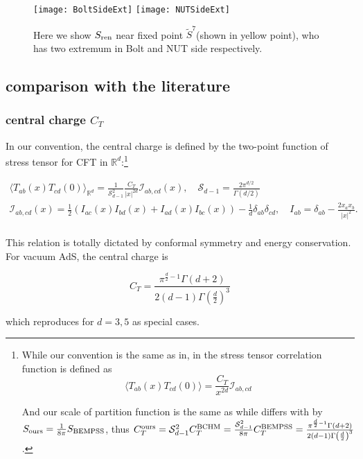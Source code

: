 \documentclass[12pt, a4paper]{article}
\numberwithin{equation}{section}
\newcommand{\be}{\begin{equation}}
\newcommand{\ee}{\end{equation}}
\newcommand{\cS}{\mathcal{S}}
\newcommand{\cI}{\mathcal{I}}
\begin{document}
\begin{figure}[t]
	\centering
	\texttt{[image: BoltSideExt]}
	\hfil
	\texttt{[image: NUTSideExt]}
	\caption{{\rm Here we show $S_{\rm ren}$ near fixed point $\tilde{S}^7$(shown in yellow point), who has two extremum in Bolt and NUT side respectively.}}
	\label{BoltSideExt}
\end{figure}

\subsection{comparison with the literature}
	\subsubsection{central charge $C_T$}
In our convention, the central charge is defined by the two-point function of stress tensor for CFT in $\mathbb{R}^d$:\footnote{While our convention is the same as in\cite{Bobev:2017pf}, in \cite{Bueno:2018pf}\cite{Buchel:2010ad} the stress tensor correlation function is defined as
	\be
	\langle T_{ab}(x)T_{cd}(0) \rangle = \frac{C_T}{x^{2d}}\cI_{ab,cd}
	\ee
	
	And our scale of partition function is the same as \cite{Bueno:2018pf} while differs with \cite{Buchel:2010ad} by $S_{\rm ours} = \frac{1}{8\pi} S_{\rm BEMPSS}$, thus $C_T^{\rm ours} = \cS_{d-1}^2 C_T^{\rm BCHM} = \frac{ \cS_{d-1}^2}{8\pi}C_T^{\rm BEMPSS} =\frac{\pi ^{\frac{d}{2}-1} \Gamma (d+2)}{2 (d-1) \Gamma \left(\frac{d}{2}\right)^3} $.
}

\be
\begin{aligned}
	\langle T_{ab}(x)T_{cd}(0)\rangle_{\mathbb{R}^d} = \frac{1}{\cS_{d-1}^2}\frac{C_T}{|x|^{2d}}\cI_{ab,cd}(x),\quad \cS_{d-1} = \frac{2\pi^{d/2}}{\Gamma(d/2)}\\
	\cI_{ab,cd}(x) = \frac{1}{2}(I_{ac}(x)I_{bd}(x)+I_{ad}(x)I_{bc}(x)) - \frac{1}{d}\delta_{ab}\delta_{cd},\quad I_{ab} = \delta_{ab}-\frac{2x_ax_b}{|x|^2}.\\
\end{aligned}
\label{TTRd}
\ee

This relation is totally dictated by conformal symmetry and energy conservation\cite{Erdmenger:1996gd}. For vacuum AdS, the central charge is 

\be
C_T = \frac{\pi ^{\frac{d}{2}-1} \Gamma (d+2)}{2 (d-1) \Gamma \left(\frac{d}{2}\right)^3}
\ee

which reproduces \cite{Bobev:2017pf} for $d=3,5$ as special cases.
\end{document}
